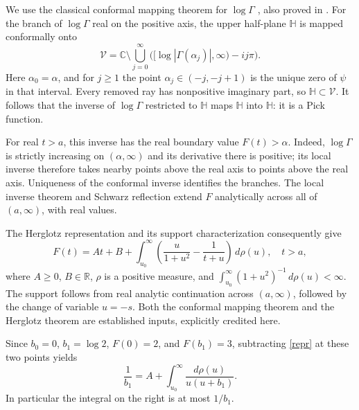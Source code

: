 \documentclass[11pt]{article}
\newcommand{\HH}{\mathbb H}
\begin{document}
We use the classical conformal mapping theorem for $\log\Gamma$
\cite[\S2, equation (2)]{PedersenInverse}, also proved in
\cite[Proposition 6.4]{PedersenSurvey}. For the branch of $\log\Gamma$
real on the positive axis, the upper half-plane $\HH$ is mapped
conformally onto
\[
 \mathcal V=\mathbb C\setminus
       \bigcup_{j=0}^\infty
       \bigl([\log|\Gamma(\alpha_j)|,\infty)-ij\pi\bigr).
\]
Here $\alpha_0=\alpha$, and for $j\geq1$ the point
$\alpha_j\in(-j,-j+1)$ is the unique zero of $\psi$ in that interval.
Every removed ray has nonpositive imaginary part, so
$\HH\subset\mathcal V$. It follows that the inverse of $\log\Gamma$
restricted to $\HH$ maps $\HH$ into $\HH$: it is a Pick function.

For real $t>a$, this inverse has the real boundary value
$F(t)>\alpha$. Indeed, $\log\Gamma$ is strictly increasing on
$(\alpha,\infty)$ and its derivative there is positive; its local
inverse therefore takes nearby points above the real axis to points
above the real axis. Uniqueness of the conformal inverse identifies
the branches. The local inverse theorem and Schwarz reflection
extend $F$ analytically across all of $(a,\infty)$, with real values.

The Herglotz representation and its support characterization
\cite[p.~90]{PedersenSurvey} consequently give
\begin{equation}\label{repr}
 F(t)=A t+B+
       \int_{u_0}^\infty
       \left(\frac{u}{1+u^2}-\frac1{t+u}\right)\,d\rho(u),
 \quad t>a,
\end{equation}
where $A\geq0$, $B\in\mathbb R$, $\rho$ is a positive measure,
and $\int_{u_0}^\infty(1+u^2)^{-1}\,d\rho(u)<\infty$.
The support follows from real analytic continuation across
$(a,\infty)$, followed by the change of variable $u=-s$.
Both the conformal mapping theorem and the Herglotz theorem are
established inputs, explicitly credited here.

Since $b_0=0$, $b_1=\log2$, $F(0)=2$, and $F(b_1)=3$,
subtracting \eqref{repr} at these two points yields
\begin{equation}\label{moment}
 \frac1{b_1}
   =A+\int_{u_0}^\infty\frac{d\rho(u)}{u(u+b_1)}.
\end{equation}
In particular the integral on the right is at most $1/b_1$.
\end{document}
